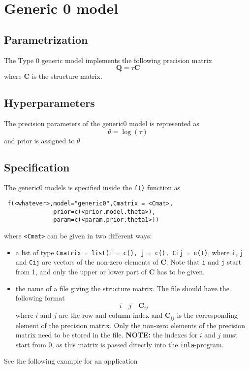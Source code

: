 \documentclass[a4paper,11pt]{article}
\begin{document}
\section*{Generic 0 model}

\subsection*{Parametrization}

The Type 0 generic model implements the following precision matrix
\begin{displaymath}
    \mathbf{Q}=\tau\mathbf{C}
\end{displaymath}
where $\mathbf{C}$ is the structure matrix.

\subsection*{Hyperparameters}

The precision parameters of the generic0 model is represented as
\begin{displaymath}
    \theta = \log(\tau)
\end{displaymath}
and prior is assigned to $\theta$

\subsection*{Specification}

The generic0 models is specified inside the {\tt f()} function as
\begin{verbatim}
 f(<whatever>,model="generic0",Cmatrix = <Cmat>,
              prior=c(<prior.model.theta>),
              param=c(<param.prior.theta1>))
\end{verbatim}


where {\tt <Cmat>} can be given in two different ways:
\begin{itemize}
\item a list of type {\tt Cmatrix = list(i = c(), j = c(), Cij =
        c())}, where {\tt i}, {\tt j} and {\tt Cij} are vectors of the
    non-zero elements of $\mathbf{C}$. Note that {\tt i} and {\tt j}
    start from 1, and only the upper or lower part of $\mathbf{C}$ has
    to be given.
\item the name of a file giving the structure matrix. The file should
    have the following format
    \[
    i\quad j\quad \mathbf{C}_{ij}
    \]
    where $i$ and $j$ are the row and column index and
    $\mathbf{C}_{ij}$ is the corresponding element of the precision
    matrix. Only the non-zero elements of the precision matrix need to
    be stored in the file.  {\bf NOTE:} the indexes for $i$ and $j$
    must start from 0, as this matrix is passed directly into the
    \texttt{inla}-program.
\end{itemize}
See the following example for an application
\end{document}
